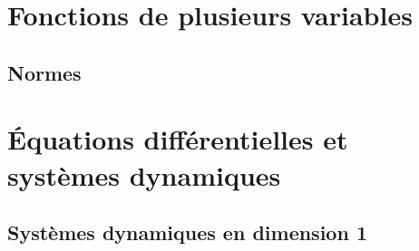 \documentclass[french, 12pt]{article}
\numberwithin{exercise}{section}
\numberwithin{equation}{section}
\begin{document}


\section{Fonctions de plusieurs variables} 
\newcommand{\multivar}{/home/robin/ENSEIGN/Cours/MathBiologie/L3-ENS-Math1/Exercices/MultiVar}

\subsection{Normes}





\section{\'Equations différentielles et systèmes dynamiques} 
\newcommand{\equadiff}{/home/robin/ENSEIGN/Cours/MathBiologie/L3-ENS-Math1/Exercices/EquaDiff}

\subsection{Systèmes dynamiques en dimension 1}


\end{document}
